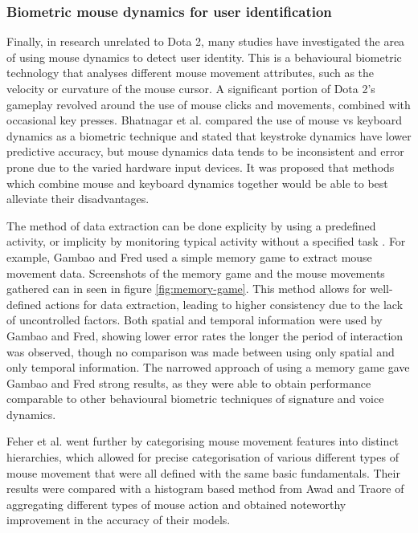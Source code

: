 \documentclass[Report.tex]{subfiles}
\begin{document}
\subsubsection{Biometric mouse dynamics for user identification}
Finally, in research unrelated to Dota 2, many studies have investigated the area of using mouse dynamics to detect user identity. This is a behavioural biometric technology that analyses different mouse movement attributes, such as the velocity or curvature of the mouse cursor. A significant portion of Dota 2's gameplay revolved around the use of mouse clicks and movements, combined with occasional key presses. Bhatnagar et al. \cite{mouse-vs-keyboard} compared the use of mouse vs keyboard dynamics as a biometric technique and stated that keystroke dynamics have lower predictive accuracy, but mouse dynamics data tends to be inconsistent and error prone due to the varied hardware input devices. It was proposed that methods which combine mouse and keyboard dynamics together would be able to best alleviate their disadvantages.

The method of data extraction can be done explicity by using a predefined activity, or implicity by monitoring typical activity without a specified task \cite{mouse-dynamics}. For example, Gambao and Fred \cite{mouse-features} used a simple memory game to extract mouse movement data. Screenshots of the memory game and the mouse movements gathered can in seen in figure \ref{fig:memory-game}. This method allows for well-defined actions for data extraction, leading to higher consistency due to the lack of uncontrolled factors. Both spatial and temporal information were used by Gambao and Fred, showing lower error rates the longer the period of interaction was observed, though no comparison was made between using only spatial and only temporal information. The narrowed approach of using a memory game gave Gambao and Fred strong results, as they were able to obtain performance comparable to other behavioural biometric techniques of signature and voice dynamics. 


Feher et al. \cite{mouse-dynamics} went further by categorising mouse movement features into distinct hierarchies, which allowed for precise categorisation of various different types of mouse movement that were all defined with the same basic fundamentals. Their results were compared with a histogram based method from Awad and Traore \cite{mouse-histogram} of aggregating different types of mouse action and obtained noteworthy improvement in the accuracy of their models.
\end{document}
